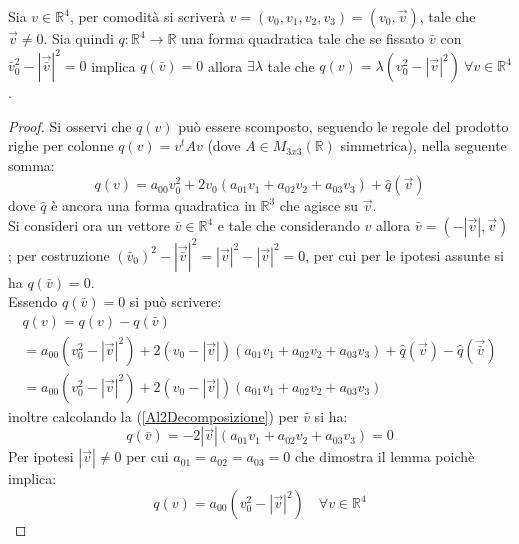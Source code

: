 \begin{lemma}
    Sia $v\in\mathbb{R}^4$, per comodità si scriverà $v=(v_0,v_1,v_2,v_3)=(v_0,\vec{v})$, tale che $\vec{v}\neq 0$. Sia quindi $q:\mathbb{R}^4\rightarrow\mathbb{R}$ 
    una forma quadratica tale che se fissato $\bar{v}$ con $\bar{v}_0^2-|\vec{\bar{v}}|^2=0$ implica $ q(\bar{v})=0$ allora $\exists \lambda $ 
    tale che $ q(v)=\lambda(v_0^2-|\vec{v}|^2)\ \forall v\in\mathbb{R}^4$.
    \label{lemm:A2}
\end{lemma}
\begin{proof}
    Si osservi che $q(v)$ può essere scomposto, seguendo le regole del prodotto righe per colonne $q(v)=v^tAv$ (dove 
    $A\in M_{3x3}(\mathbb{R})$ simmetrica), nella seguente somma:
    \begin{equation*}
        q(v)=a_{00}v_0^2+2v_0(a_{01}v_1+a_{02}v_2+a_{03}v_3)+\hat{q}(\vec{v})
    \end{equation*}
    dove $\hat{q}$ è ancora una forma quadratica in $\mathbb{R}^3$ che agisce su $\vec{v}$.\\
    Si consideri ora un vettore $\bar{v}\in \mathbb{R}^4$ e tale che considerando $v$ allora $\bar{v}=(-|\vec{v}|,\vec{v})$; per costruzione
    $(\bar{v}_0)^2-|\vec{\bar{v}}|^2=|\vec{v}|^2-|\vec{v}|^2=0$, per cui per le ipotesi assunte si ha $q(\bar{v})=0$.\\
    Essendo $q(\bar{v})=0$ si può scrivere:
    \begin{equation}
        \begin{gathered}
            q(v)=q(v)-q(\bar{v})\\
            =a_{00}(v_0^2-|\vec{v}|^2)+2(v_0-|\vec{v}|)(a_{01}v_1+a_{02}v_2+a_{03}v_3)+\hat{q}(\vec{v})-\hat{q}(\vec{\bar{v}})\\
            =a_{00}(v_0^2-|\vec{v}|^2)+2(v_0-|\vec{v}|)(a_{01}v_1+a_{02}v_2+a_{03}v_3)
        \end{gathered}
       \label{Al2Decomposizione}
    \end{equation}
   inoltre calcolando la (\ref{Al2Decomposizione}) per $\bar{v}$ si ha:
   \begin{equation*}
    q(\bar{v})=-2|\vec{v}|(a_{01}v_1+a_{02}v_2+a_{03}v_3)=0
   \end{equation*}
   Per ipotesi $|\vec{v}|\neq0$ per cui $a_{01}=a_{02}=a_{03}=0$ che dimostra il lemma poichè implica:
   \begin{equation}
    q(v)=a_{00}(v_0^2-|\vec{v}|^2)\quad \forall v\in\mathbb{R}^4
   \end{equation}
\end{proof}

